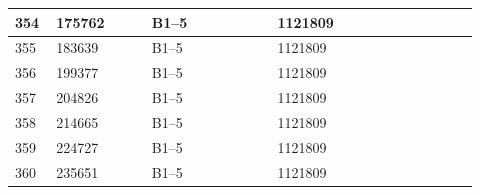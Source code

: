 \documentclass[UTF8,10pt,a4paper,fontset=fandol]{ctexart}
\newcommand{\fieldvalue}[1]{#1}
\begin{document}
\begin{center}
\begin{tabular}{|p{0.08\linewidth}|p{0.19\linewidth}|p{0.25\linewidth}|p{0.25\linewidth}|p{0.15\linewidth}|}
\fieldvalue{354} &
\fieldvalue{175762} &
\fieldvalue{B1--5} &
\fieldvalue{1121809} & \\ \hline
\fieldvalue{355} &
\fieldvalue{183639} &
\fieldvalue{B1--5} &
\fieldvalue{1121809} & \\ \hline
\fieldvalue{356} &
\fieldvalue{199377} &
\fieldvalue{B1--5} &
\fieldvalue{1121809} & \\ \hline
\fieldvalue{357} &
\fieldvalue{204826} &
\fieldvalue{B1--5} &
\fieldvalue{1121809} & \\ \hline
\fieldvalue{358} &
\fieldvalue{214665} &
\fieldvalue{B1--5} &
\fieldvalue{1121809} & \\ \hline
\fieldvalue{359} &
\fieldvalue{224727} &
\fieldvalue{B1--5} &
\fieldvalue{1121809} & \\ \hline
\fieldvalue{360} &
\fieldvalue{235651} &
\fieldvalue{B1--5} &
\fieldvalue{1121809} & \\ \hline

\end{tabular}
\end{center}
\end{document}

